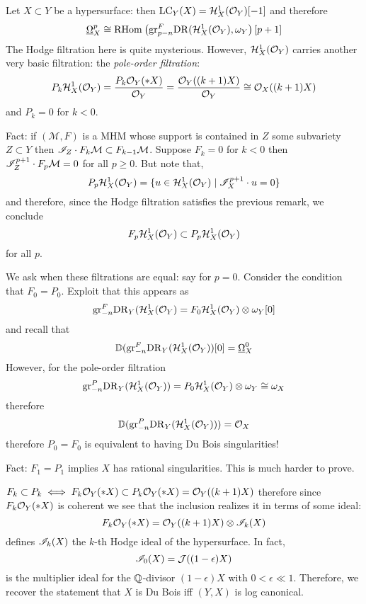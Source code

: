 \documentclass[12pt]{article}
\renewcommand{\gr}{\mathrm{gr}}
\renewcommand{\cH}{\mathcal{H}}
\newcommand{\cM}{\mathcal{M}}
\begin{document}
\begin{example}
Let $X \subset Y$ be a hypersurface: then $\LC_Y(X) = \cH^1_X(\struct{Y})[-1]$ and therefore
\[ \ulO_X^p \cong \RHom{}{\gr^F_{p-n} \DR(\cH_X^1(\struct{Y})}{\omega_Y}[p+1] \]
The Hodge filtration here is quite mysterious. However, $\cH^1_X(\struct{Y})$ carries another very basic filtration: the \textit{pole-order filtration}: 
\[ P_k \cH^1_X(\struct{Y}) = \frac{P_k \struct{Y}(*X)}{\struct{Y}} = \frac{\struct{Y}((k+1) X)}{\struct{Y}} \cong \struct{X}((k+1) X) \]
and $P_k = 0$ for $k < 0$.  
\end{example}

Fact: if $(\cM, F)$ is a MHM whose support is contained in $Z$ some subvariety $Z \subset Y$ then $\mathscr{I}_Z \cdot F_k \mathcal{M} \subset F_{k-1} \mathcal{M}$. Suppose $F_k = 0$ for $k < 0$ then $\I_Z^{p+1} \cdot F_p \cM = 0$ for all $p \ge 0$. 
But note that,
\[ P_p \cH^1_X(\struct{Y}) = \{ u \in \cH^1_X(\struct{Y}) \mid \I_X^{p+1} \cdot u = 0 \} \]
and therefore, since the Hodge filtration satisfies the previous remark, we conclude
\[ F_p \cH_X^1(\struct{Y}) \subset P_p \cH_X^1(\struct{Y}) \]
for all $p$. 

\begin{example}
We ask when these filtrations are equal: say for $p = 0$. Consider the condition that $F_0 = P_0$. Exploit that this appears as
\[ \gr^F_{-n} \DR_Y(\cH^1_X(\struct{Y}) = F_0 \cH^1_X(\struct{Y}) \ot \omega_Y [0] \]
and recall that
\[ \DD(\gr^F_{-n} \DR_Y(\cH^1_X(\struct{Y}))[0] = \ulO_X^0 \]
However, for the pole-order filtration
\[ \gr_{-n}^P \DR_Y(\cH_X^1(\struct{Y})) = P_0 \cH^1_X(\struct{Y}) \ot \omega_Y \cong \omega_X \]
therefore
\[ \DD(\gr_{-n}^P \DR_Y(\cH_X^1(\struct{Y}))) = \struct{X} \]
therefore $P_0 = F_0$ is equivalent to having Du Bois singularities!
\end{example}

Fact: $F_1 = P_1$ implies $X$ has rational singularities. This is much harder to prove.

\begin{rmk}
$F_k \subset P_k \iff F_k \mathcal{O}_{Y}(* X) \subset P_k \mathcal{O}_{Y}(* X) = \mathcal{O}_{Y}((k+1)X)$ therefore since $F_k \mathcal{O}_{Y}(* X)$ is coherent we see that the inclusion realizes it in terms of some ideal:
\[ F_k \mathcal{O}_{Y}(* X) = \mathcal{O}_{Y}((k+1) X) \otimes \mathscr{I}_k(X) \]
defines $\mathscr{I}_k(X)$ the $k$-th Hodge ideal of the hypersurface. In fact,
\[ \mathscr{I}_0(X) = \mathcal{J}((1 - \epsilon) X) \]
is the multiplier ideal for the $\mathbb{Q}$-divisor $(1 - \epsilon) X$ with $0 < \epsilon \ll 1$. Therefore, we recover the statement that $X$ is Du Bois iff $(Y,X)$ is log canonical. 
\end{rmk}
\end{document}

